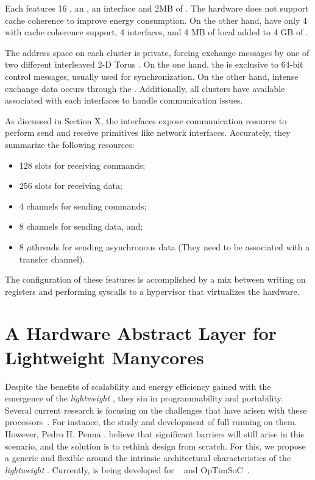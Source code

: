 			Each \ccluster features 16 \pes, an \rman, an \noc interface and 2MB of \sram.
			The hardware does not support cache coherence to improve energy consumption.
			On the other hand, \ioclusters have only 4 \rmans with cache coherence support,
			4 \noc interfaces, and 4 MB of local \sram added to 4 GB of \dram.

			The address space on each cluster is private, forcing exchange messages
			by one of two different interleaved 2-D Torus \nocs.
			On the one hand, the \cnoc is exclusive to 64-bit control messages,
			usually used for synchronization.
			On the other hand, intense exchange data occurs through the \dnoc.
			Additionally, all clusters have available \dmas associated with each
			\noc interfaces to handle communication issues.

			As discussed in Section X, the \noc interfaces expose communication
			resource to perform send and receive primitives like network interfaces.
			Accurately, they summarize the following resources:

			\begin{itemize}
				\item 128 slots for receiving commands;
				\item 256 slots for receiving data;
				\item 4 channels for sending commands;
				\item 8 channels for sending data, and;
				\item 8 $\mu$threads for sending asynchronous data
					(They need to be associated with a transfer channel).
			\end{itemize}

			The configuration of these features is accomplished by a mix between
			writing on \dma registers and performing syscalls to a hypervisor
			that virtualizes the \mppa hardware.	
	
\section{A Hardware Abstract Layer for Lightweight Manycores}
	
	Despite the benefits of scalability and energy efficiency gained with the
	emergence of the \textit{lightweight \manycores}, they sin in programmability
	and portability.
	Several current research is focusing on the challenges that have arisen with
	these processors~\cite{}.
	For instance, the study and development of full \oses running on them.
	However, Pedro H. Penna \etal. believe that significant barriers will still
	arise in this scenario, and the solution is to rethink \os design from scratch.
	For this, we propose a generic and flexible \hal around the intrinsic
	architectural characteristics of the \textit{lightweight \manycores}.
	Currently, \hal is being developed for \mppa~\cite{} and OpTimSoC~\cite{}.

